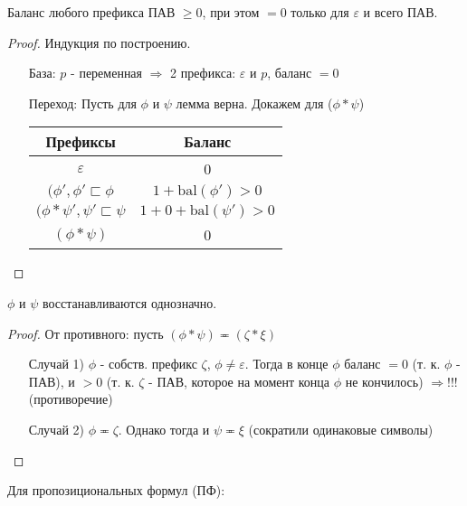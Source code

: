 \begin{lemma}
Баланс любого префикса ПАВ $\geq 0$, при этом $= 0$ только для $\varepsilon$ и всего ПАВ.
\end{lemma}
\begin{proof}
    Индукция по построению.
    \begin{itemize}
        \item [База: ] $p$ - переменная $\Rightarrow$ 2 префикса: $\varepsilon$ и $p$, баланс $= 0$
        \item [Переход: ] Пусть для $\phi$ и $\psi$ лемма верна. Докажем для ($\phi * \psi$)

            \begin{center}
            \begin{tabular}{ |c|c| } 
             \hline
             Префиксы & Баланс \\
             \hline
             $\varepsilon$ & 0 \\
             \hline
             $(\phi', \phi' \sqsubset \phi$ & $1 + \text{bal}(\phi') > 0$ \\
             \hline
             $(\phi * \psi', \psi' \sqsubset \psi$ & $1 + 0 + \text{bal}(\psi')> 0$ \\
             \hline
             $(\phi * \psi)$ & 0 \\
             \hline
            \end{tabular}
            \end{center}
    \end{itemize}
\end{proof}
\begin{lemma}
$\phi$ и $\psi$ восстанавливаются однозначно.
\end{lemma}
\begin{proof}
От противного: пусть $(\phi * \psi) \eqcirc (\zeta * \xi)$
\begin{itemize}
    \item [Случай 1) ] $\phi $ - собств. префикс $\zeta$, $\phi \neq \varepsilon$. Тогда в конце $\phi$ баланс $= 0$ (т. к. $\phi$ - ПАВ), и $> 0$ (т. к. $\zeta$ - ПАВ, которое на момент конца $\phi$ не кончилось) $\Rightarrow !!!$ (противоречие)
    \item [Случай 2) ]  $\phi \eqcirc \zeta$. Однако тогда и $\psi \eqcirc \xi$ (сократили одинаковые символы)
\end{itemize}
\end{proof}

Для пропозициональных формул (ПФ):

